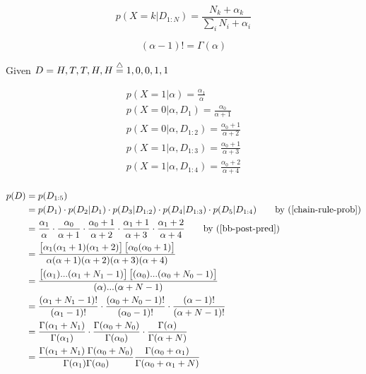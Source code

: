 \documentclass{article}
\begin{document}
\begin{equation}\label{bb-post-pred}
    p(X=k|D_{1:N}) = \frac{N_k + \alpha_k}{\sum_i N_i + \alpha_i}
\end{equation}

\begin{equation}\label{gamma-def}
  (\alpha - 1)! = \Gamma(\alpha)
\end{equation}

Given $D = H,T,T,H,H \defeq 1,0,0,1,1$

\begin{gather*}
  p(X=1|\alpha) = \frac{\alpha_1}{\alpha} \\
  p(X=0|\alpha, D_1) = \frac{\alpha_0}{\alpha + 1} \\
  p(X=0|\alpha, D_{1:2}) = \frac{\alpha_0 + 1}{\alpha + 2} \\
  p(X=1|\alpha, D_{1:3}) = \frac{\alpha_0 + 1}{\alpha + 3} \\
  p(X=1|\alpha, D_{1:4}) = \frac{\alpha_0 + 2}{\alpha + 4} \\
\end{gather*}

\begin{align*}
  p(D) &= p(D_{1:5}) \\
       &= p(D_1) \cdot p(D_2|D_1) \cdot p(D_3|D_{1:2}) \cdot
         p(D_4|D_{1:3}) \cdot p(D_5|D_{1:4}) \qquad \text{by ($\ref{chain-rule-prob}$)} \\
       &= \frac{\alpha_1}{\alpha} \cdot
         \frac{\alpha_0}{\alpha + 1} \cdot \frac{\alpha_0 + 1}{\alpha + 2}
         \cdot \frac{\alpha_1 + 1}{\alpha + 3} \cdot \frac{\alpha_1 +
         2}{\alpha + 4} \qquad \text{by ($\ref{bb-post-pred}$)} \\
       &= \frac{\left[ \alpha_1 (\alpha_1 + 1) (\alpha_1 + 2) \right] \left[
         \alpha_0 (\alpha_0 + 1) \right]}
         {\alpha (\alpha + 1) (\alpha + 2) (\alpha + 3) (\alpha + 4) }
  \\
       &= \frac{\left[ (\alpha_1) ... (\alpha_1 + N_1 - 1) \right] \left[
         (\alpha_0) ... (\alpha_0 + N_0 - 1) \right]}
         {(\alpha) ... (\alpha + N - 1)} \\
       &= \frac{(\alpha_1 + N_1 - 1)!}{(\alpha_1 - 1)!} \cdot
         \frac{(\alpha_0 + N_0 - 1)!}{(\alpha_0 - 1)!} \cdot
         \frac{(\alpha - 1)!}{(\alpha + N - 1)!} \\
       &= \frac{\Gamma(\alpha_1 + N_1)}{\Gamma(\alpha_1)} \cdot \frac{\Gamma(\alpha_0
         + N_0)}{\Gamma(\alpha_0)} \cdot
         \frac{\Gamma(\alpha)}{\Gamma(\alpha + N)} \\
       &= \frac{\Gamma(\alpha_1 + N_1) \; \Gamma(\alpha_0 +
         N_0)}{\Gamma(\alpha_1) \Gamma(\alpha_0)}
         \frac{\Gamma(\alpha_0 + \alpha_1)}{\Gamma(\alpha_0 + \alpha_1 +
         N)}
\end{align*}
\end{document}
